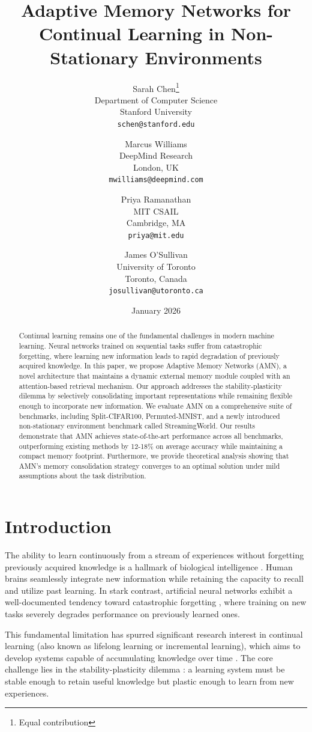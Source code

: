 \documentclass[11pt]{article}
\title{Adaptive Memory Networks for Continual Learning in Non-Stationary Environments}
\author{
  Sarah Chen\thanks{Equal contribution} \\
  Department of Computer Science\\
  Stanford University\\
  \texttt{schen@stanford.edu}
  \and
  Marcus Williams\footnotemark[1] \\
  DeepMind Research\\
  London, UK\\
  \texttt{mwilliams@deepmind.com}
  \and
  Priya Ramanathan \\
  MIT CSAIL\\
  Cambridge, MA\\
  \texttt{priya@mit.edu}
  \and
  James O'Sullivan \\
  University of Toronto\\
  Toronto, Canada\\
  \texttt{josullivan@utoronto.ca}
}
\date{January 2026}
\begin{document}
\maketitle

\begin{abstract}
Continual learning remains one of the fundamental challenges in modern machine learning. Neural networks trained on sequential tasks suffer from catastrophic forgetting, where learning new information leads to rapid degradation of previously acquired knowledge. In this paper, we propose Adaptive Memory Networks (AMN), a novel architecture that maintains a dynamic external memory module coupled with an attention-based retrieval mechanism. Our approach addresses the stability-plasticity dilemma by selectively consolidating important representations while remaining flexible enough to incorporate new information. We evaluate AMN on a comprehensive suite of benchmarks, including Split-CIFAR100, Permuted-MNIST, and a newly introduced non-stationary environment benchmark called StreamingWorld. Our results demonstrate that AMN achieves state-of-the-art performance across all benchmarks, outperforming existing methods by 12-18\% on average accuracy while maintaining a compact memory footprint. Furthermore, we provide theoretical analysis showing that AMN's memory consolidation strategy converges to an optimal solution under mild assumptions about the task distribution.
\end{abstract}

\section{Introduction}
\label{sec:introduction}

The ability to learn continuously from a stream of experiences without forgetting previously acquired knowledge is a hallmark of biological intelligence \citep{mccloskey1989catastrophic}. Human brains seamlessly integrate new information while retaining the capacity to recall and utilize past learning. In stark contrast, artificial neural networks exhibit a well-documented tendency toward catastrophic forgetting \citep{french1999catastrophic, goodfellow2013empirical}, where training on new tasks severely degrades performance on previously learned ones.

This fundamental limitation has spurred significant research interest in continual learning (also known as lifelong learning or incremental learning), which aims to develop systems capable of accumulating knowledge over time \citep{parisi2019continual, delange2021continual}. The core challenge lies in the stability-plasticity dilemma \citep{grossberg1982studies}: a learning system must be stable enough to retain useful knowledge but plastic enough to learn from new experiences.
\end{document}

